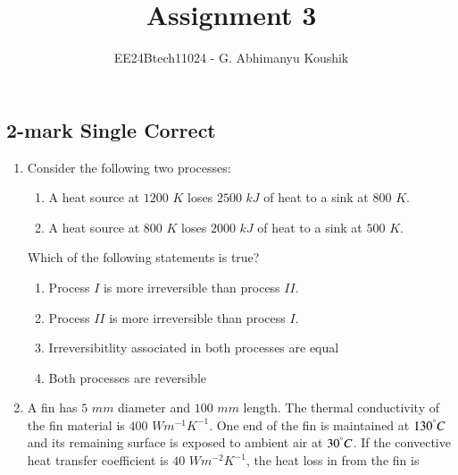 \documentclass[journal,12pt,onecolumn]{IEEEtran}
\theoremstyle{remark}
\begin{document}
\title{Assignment 3}
\author{EE24Btech11024 - G. Abhimanyu Koushik}
\maketitle
\renewcommand{\thefigure}{\theenumi}
\renewcommand{\thetable}{\theenumi}
\subsection*{2-mark Single Correct}
\begin{enumerate}

\item Consider the following two processes:
\begin{enumerate}[label=\alph*., leftmargin=2cm, labelsep=1cm]
    \item A heat source at $1200$ $K$ loses $2500$ $kJ$ of heat to a sink at $800$ $K$.
    \item A heat source at $800$ $K$ loses $2000$ $kJ$ of heat to a sink at $500$ $K$.
\end{enumerate}
Which of the following statements is true?

\hfill{}
\begin{enumerate}
\item Process $I$ is more irreversible than process $II$.
\item Process $II$ is more irreversible than process $I$.
\item Irreversibitlity associated in both processes are equal
\item Both processes are reversible
\end{enumerate}

\item A fin has $5$ $mm$ diameter and $100$ $mm$ length. The thermal conductivity of the fin material is $400$ $Wm^{-1}K^{-1}$. One end of the fin is maintained at $130^\degree C$ and its remaining surface is exposed to ambient air at $30^\degree C$. If the convective heat transfer coefficient is $40$ $Wm^{-2}K^{-1}$, the heat loss in  from the fin is

\hfill{}
\begin{enumerate}
\end{enumerate}


\end{enumerate}
\end{document}
